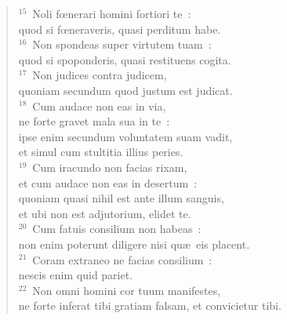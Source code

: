 \begin{flushleft}
\begin{verse}
${}^{15}$~Noli fœnerari homini fortiori te~:\\ quod si fœneraveris, quasi perditum habe.\\
${}^{16}$~Non spondeas super virtutem tuam~:\\ quod si spoponderis, quasi restituens cogita.\\
${}^{17}$~Non judices contra judicem,\\ quoniam secundum quod justum est judicat.\\
${}^{18}$~Cum audace non eas in via,\\ ne forte gravet mala sua in te~:\\ ipse enim secundum voluntatem suam vadit,\\ et simul cum stultitia illius peries.\\
${}^{19}$~Cum iracundo non facias rixam,\\ et cum audace non eas in desertum~:\\ quoniam quasi nihil est ante illum sanguis,\\ et ubi non est adjutorium, elidet te.\\
${}^{20}$~Cum fatuis consilium non habeas~:\\ non enim poterunt diligere nisi qu\ae\ eis placent.\\
${}^{21}$~Coram extraneo ne facias consilium~:\\ nescis enim quid pariet.\\
${}^{22}$~Non omni homini cor tuum manifestes,\\ ne forte inferat tibi gratiam falsam, et convicietur tibi.\end{verse}\end{flushleft}


